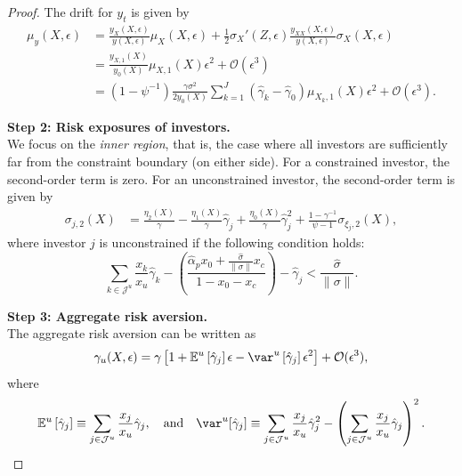 \begin{proof}
The drift for $y_t$ is given by
\begin{align}
    \mu_{y}(X,\epsilon) &= \frac{y_{X}(X,\epsilon)}{y(X,\epsilon)} \mu_{X}(X,\epsilon)+ \frac{1}{2}  \sigma_{X}'(Z,\epsilon) \frac{y_{XX}(X,\epsilon)}{y(X,\epsilon)} \sigma_{X}(X,\epsilon)\nonumber\\
    &=  \frac{y_{X,1}(X)}{y_{0}(X)} \mu_{X,1}(X)\epsilon^2+\mathcal{O}(\epsilon^3)\nonumber\\
    &= \left(1-\psi^{-1}\right)\frac{\gamma \sigma^2}{2 y_{0}(X)} \sum_{k=1}^J \left( \hat{\gamma}_k - \hat{\gamma}_0  \right) \mu_{X_k,1}(X) \epsilon^2 + \mathcal{O}(\epsilon^3).
\end{align}

\noindent\textbf{Step 2: Risk exposures of investors.}\\
We focus on the \textit{inner region}, that is, the case where all investors are sufficiently far from the constraint boundary (on either side). For a constrained investor, the second-order term is zero. For an unconstrained investor, the second-order term is given by
\begin{align}
    \sigma_{j,2}(X) &= \frac{\eta_2(X)}{\gamma} - \frac{\eta_1(X)}{\gamma}\hat{\gamma}_j + \frac{\eta_0(X)}{\gamma}\hat{\gamma}_j^2 + \frac{1-\gamma^{-1}}{\psi-1} \sigma_{\xi_j,2}(X),
\end{align}
where investor $j$ is unconstrained if the following condition holds:
\begin{equation}
     \sum_{k\in\mathcal{J}^u} \frac{x_k}{x_u} \hat{\gamma}_k -\left(\frac{\hat{\alpha}_p  x_0+\frac{\hat{\sigma}}{\|\sigma\|} x_c }{1-x_0-x_c}\right)- \hat{\gamma}_j  < \frac{\hat{\sigma}}{\|\sigma\|}.
\end{equation}



\noindent\textbf{Step 3: Aggregate risk aversion.}\\
The aggregate risk aversion can be written as
\begin{equation}
    \gamma_u(X,\epsilon) = \gamma \left[ 1 + \mathbb{E}^u\left[\hat{\gamma}_j\right] \epsilon - \var^u\left[\hat{\gamma}_j\right] \epsilon^2 \right] + \mathcal{O}(\epsilon^3),
\end{equation}
where 
\[\mathbb{E}^u\left[ \hat{\gamma}_j\right] \equiv\sum_{j\in\mathcal{J}^u} \frac{x_j}{x_u} \hat{\gamma}_j,\quad\text{and}\quad \var^u[\hat{\gamma}_j] \equiv \sum_{j\in\mathcal{J}^u} \frac{x_j}{x_u} \hat{\gamma}_j^2 - \left(\sum_{j\in\mathcal{J}^u} \frac{x_j}{x_u} \hat{\gamma}_j\right)^2.\]


\end{proof}
